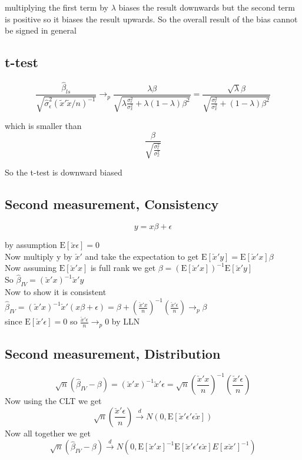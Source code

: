 \documentclass[11pt]{article}
\newcommand{\plim}{\rightarrow_{p}}
\newcommand{\E}{\mathrm{E}}
\begin{document}
multiplying the first term by $\lambda$ biases the result downwards but the second term is positive so it biases the result upwards. So the overall result of the bias cannot be signed in general 

\subsection{t-test}

$$\frac{\hat{\beta}_{ls}}{\sqrt{\hat{\sigma}_{\epsilon}^2(\tilde{x}'\tilde{x}/n)^{-1}}} \plim \frac{\lambda \beta}{\sqrt{\lambda \frac{ \sigma_{\epsilon}^2}{\sigma_{x}^2} + \lambda(1-\lambda)\beta^2 }} 
= \frac{\sqrt{\lambda}\beta}{\sqrt{ \frac{ \sigma_{\epsilon}^2}{\sigma_{x}^2} + (1-\lambda)\beta^2 }}$$

which is smaller than 
$$ \frac{\beta}{\sqrt{\frac{\sigma_{\epsilon}^2}{\sigma_{x}^2}}}$$

So the t-test is downward biased 

\subsection{Second measurement, Consistency}

$$ y = x\beta + \epsilon$$


by assumption $ \E[\check{x} \epsilon] = 0 $ \\ 
Now multiply y by $ \check{x}'$ and take the expectation to get $ \E[\check{x}'y]=\E[\check{x}'x]\beta$ \\
Now assuming $\E[\check{x}'x]$ is full rank we get $\beta =(\E[\check{x}'x])^{-1}\E[\check{x}'y]$ \\
So $\hat{\beta}_{IV}=(\check{x}'x)^{-1}\check{x}'y$\\
Now to show it is consistent \\
$\hat{\beta}_{IV}=(\check{x}'x)^{-1}\check{x}'(x\beta  + \epsilon) = \beta + (\frac{\check{x}'x}{n})^{-1}(\frac{\check{x}'\epsilon}{n}) \plim \beta$ \\
since $\E[\check{x}'\epsilon] = 0$ so $\frac{\check{x}'\epsilon}{n} \plim 0$ by LLN

\subsection{Second measurement, Distribution}

$$\sqrt{n}(\hat{\beta}_{IV}-\beta) = (\check{x}'x)^{-1}\check{x}'\epsilon = \sqrt{n}\left(\frac{\check{x}'x}{n}\right)^{-1}\left(\frac{\check{x}'\epsilon}{n}\right)$$
Now using the CLT we get 
$$\sqrt{n}\left(\frac{\check{x}'\epsilon}{n}\right) \xrightarrow{d} N(0,\E[\check{x}'\epsilon'\epsilon\check{x}])$$
Now all together we get 
$$\sqrt{n}(\hat{\beta}_{IV}-\beta) \xrightarrow{d} N(0,\E[\check{x}'x]^{-1}\E[\check{x}'\epsilon'\epsilon\check{x}]E[x\check{x}']^{-1})$$
\end{document}
